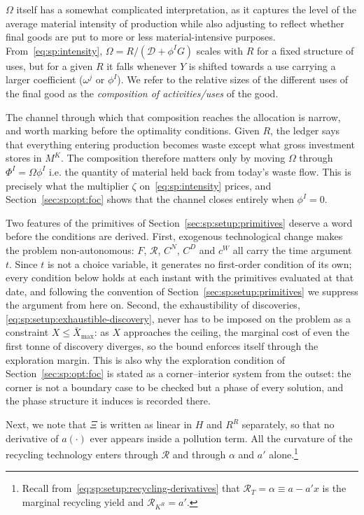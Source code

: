 $\Omega$ itself has a somewhat complicated interpretation, as it captures the level of the average material intensity of production while also adjusting to reflect whether final goods are put to more or less material-intensive purposes. From~\eqref{eq:sp:intensity}, $\Omega=R/\left(\mathcal D+\phi^IG\right)$ scales with $R$ for a fixed structure of uses, but for a given $R$ it falls whenever $Y$ is shifted towards a use carrying a larger coefficient ($\omega^j$ or $\phi^I$). We refer to the relative sizes of the different uses of the final good as the \textit{composition of activities/uses} of the good.

The channel through which that composition reaches the allocation is narrow, and worth marking before the optimality conditions. Given $R$, the ledger says that everything entering production becomes waste except what gross investment stores in $M^K$. The composition therefore matters only by moving $\Omega$ through $\Phi^I=\Omega\phi^I$ i.e. the quantity of material held back from today's waste flow. This is precisely what the multiplier $\zeta$ on~\eqref{eq:sp:intensity} prices, and Section~\ref{sec:sp:opt:foc} shows that the channel closes entirely when $\phi^I=0$.

Two features of the primitives of Section~\ref{sec:sp:setup:primitives} deserve a word before the conditions are derived. First, exogenous technological change makes the problem non-autonomous: $F$, $\mathcal R$, $C^N$, $C^D$ and $c^W$ all carry the time argument $t$. Since $t$ is not a choice variable, it generates no first-order condition of its own; every condition below holds at each instant with the primitives evaluated at that date, and following the convention of Section~\ref{sec:sp:setup:primitives} we suppress the argument from here on. Second, the exhaustibility of discoveries, \eqref{eq:sp:setup:exhaustible-discovery}, never has to be imposed on the problem as a constraint $X\le\bar X_{\max}$: as $X$ approaches the ceiling, the marginal cost of even the first tonne of discovery diverges, so the bound enforces itself through the exploration margin. This is also why the exploration condition of Section~\ref{sec:sp:opt:foc} is stated as a corner--interior system from the outset: the corner is not a boundary case to be checked but a phase of every solution, and the phase structure it induces is recorded there.


Next, we note that $\Xi$ is written as linear in $H$ and $R^R$ separately, so that no derivative of $a(\cdot)$ ever appears inside a pollution term. All the curvature of the recycling
technology enters through $\mathcal R$ and through $\alpha$ and $a'$ alone.\footnote{Recall
from~\eqref{eq:sp:setup:recycling-derivatives} that $\mathcal R_T=\alpha\equiv a-a'x$ is the marginal
recycling yield and $\mathcal R_{K^R}=a'$.}


